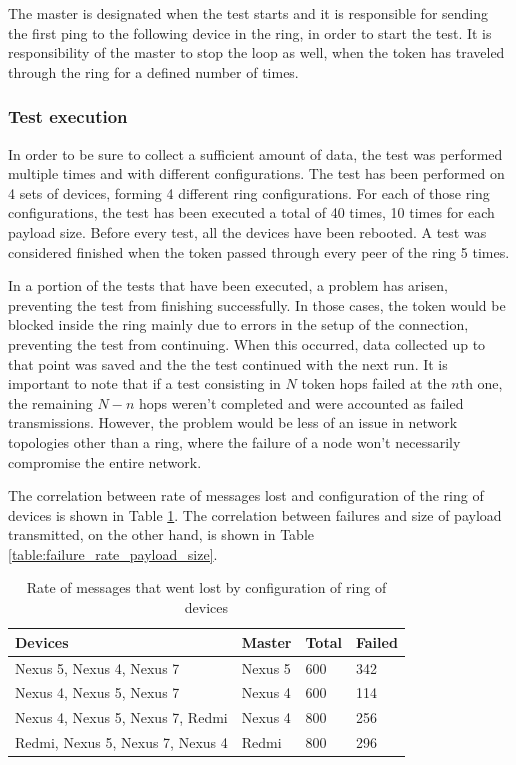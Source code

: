 The master is designated when the test starts and it is responsible for sending the first ping to the following device in the ring, in order to start the test.
It is responsibility of the master to stop the loop as well, when the token has traveled through the ring for a defined number of times.

\subsubsection{Test execution}
In order to be sure to collect a sufficient amount of data, the test was performed multiple times and with different configurations.
The test has been performed on 4 sets of devices, forming 4 different ring configurations.
For each of those ring configurations, the test has been executed a total of 40 times, 10 times for each payload size.
Before every test, all the devices have been rebooted.
A test was considered finished when the token passed through every peer of the ring 5 times.

In a portion of the tests that have been executed, a problem has arisen, preventing the test from finishing successfully.
In those cases, the token would be blocked inside the ring mainly due to errors in the setup of the connection, preventing the test from continuing.
When this occurred, data collected up to that point was saved and the the test continued with the next run.
It is important to note that if a test consisting in $N$ token hops failed at the $n$th one, the remaining $N - n$ hops weren't completed and were accounted as failed transmissions.
However, the problem would be less of an issue in network topologies other than a ring, where the failure of a node won't necessarily compromise the entire network.

The correlation between rate of messages lost and configuration of the ring of devices is shown in Table \ref{table:failure_rate_ring_config}.
The correlation between failures and size of payload transmitted, on the other hand, is shown in Table \ref{table:failure_rate_payload_size}.

\begin{table}[h]
\centering
\begin{tabular}{llll}
\hline
Devices                             & Master      & Total   &  Failed    \\ \hline
Nexus 5, Nexus 4, Nexus 7           & Nexus 5     & 600     & 342        \\
Nexus 4, Nexus 5, Nexus 7           & Nexus 4     & 600     & 114        \\
Nexus 4, Nexus 5, Nexus 7, Redmi    & Nexus 4     & 800     & 256        \\
Redmi, Nexus 5, Nexus 7, Nexus 4    & Redmi       & 800     & 296        \\
\hline
\end{tabular}
\caption{Rate of messages that went lost by configuration of ring of devices}
\label{table:failure_rate_ring_config}
\end{table}


